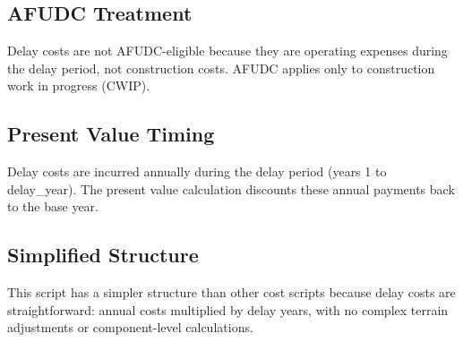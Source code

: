 \documentclass[12pt]{article}
\begin{document}
\subsection{AFUDC Treatment}

Delay costs are not AFUDC-eligible because they are operating expenses during the delay period, not construction costs. AFUDC applies only to construction work in progress (CWIP).

\subsection{Present Value Timing}

Delay costs are incurred annually during the delay period (years 1 to delay\_year). The present value calculation discounts these annual payments back to the base year.

\subsection{Simplified Structure}

This script has a simpler structure than other cost scripts because delay costs are straightforward: annual costs multiplied by delay years, with no complex terrain adjustments or component-level calculations.
\end{document}
